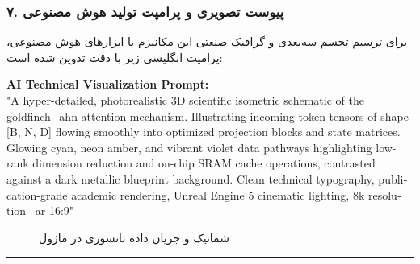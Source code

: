\subsubsection*{۷. پیوست تصویری و پرامپت تولید هوش مصنوعی}
برای ترسیم تجسم سه‌بعدی و گرافیک صنعتی این مکانیزم با ابزارهای هوش مصنوعی، پرامپت انگلیسی زیر با دقت تدوین شده است:

\vspace{0.2cm}
\begin{latin}
\footnotesize
\textbf{AI Technical Visualization Prompt:}\\
"A hyper-detailed, photorealistic 3D scientific isometric schematic of the goldfinch\_ahn attention mechanism. Illustrating incoming token tensors of shape [B, N, D] flowing smoothly into optimized projection blocks and state matrices. Glowing cyan, neon amber, and vibrant violet data pathways highlighting low-rank dimension reduction and on-chip SRAM cache operations, contrasted against a dark metallic blueprint background. Clean technical typography, publication-grade academic rendering, Unreal Engine 5 cinematic lighting, 8k resolution --ar 16:9"
\end{latin}

\begin{figure}[H]
    \centering
    \caption{شماتیک و جریان داده تانسوری در ماژول }
    \label{fig:goldfinch_ahn}
\end{figure}

\vspace{0.5cm}
\hrule
\vspace{0.5cm}
